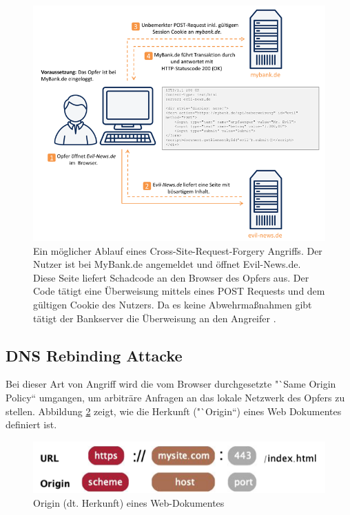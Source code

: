 \documentclass[a4paper]{book}
\begin{document}
\begin{large}
\begin{onehalfspace}
\begin{figure}[ht]
\begin{center}
\includegraphics[scale=0.55]{images/CSRF} 
\caption{Ein möglicher Ablauf eines Cross-Site-Request-Forgery Angriffs. Der Nutzer ist bei MyBank.de angemeldet und öffnet Evil-News.de. Diese Seite liefert Schadcode an den Browser des Opfers aus. Der Code tätigt eine Überweisung mittels eines POST Requests und dem gültigen Cookie des Nutzers. Da es keine Abwehrmaßnahmen gibt tätigt der Bankserver die Überweisung an den Angreifer \cite{MartinMuller.2019}.}
\label{fig:Cross-Site-Request-Forgery Ablauf}
\end{center}
\end{figure}	


\subsection{DNS Rebinding Attacke}
\label{rebinding}
Bei dieser Art von Angriff wird die vom Browser durchgesetzte "`Same Origin Policy“ umgangen, um arbiträre Anfragen an das lokale Netzwerk des Opfers zu stellen. Abbildung \ref{fig:Same-Origin} zeigt, wie die Herkunft ("`Origin“) eines Web Dokumentes definiert ist.

\begin{figure}[ht]
\begin{center}
\includegraphics[scale=0.5]{images/Same_Origin_Policy} 
\caption{Origin (dt. Herkunft) eines Web-Dokumentes \cite{GeraldDoussot.2019}}
\label{fig:Same-Origin}
\end{center}
\end{figure}


\end{onehalfspace}
\end{large}
\end{document}

